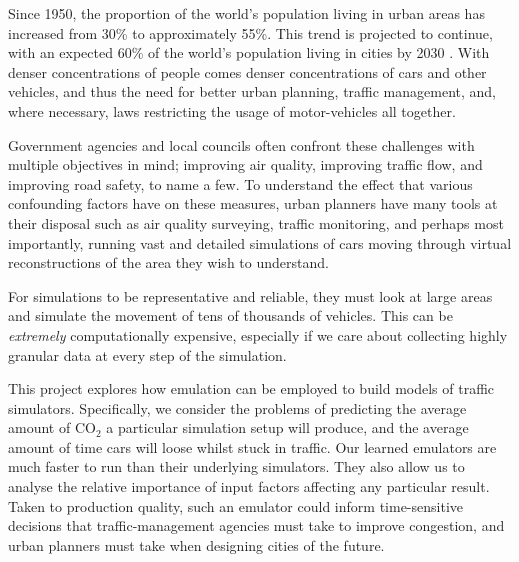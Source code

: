 Since 1950, the proportion of the world's population living in urban areas has increased from 30\% to approximately 55\%. This trend is projected to continue, with an expected 60\% of the world's population living in cities by 2030 \cite{bravo2018sustainable}. With denser concentrations of people comes denser concentrations of cars and other vehicles, and thus the need for better urban planning, traffic management, and, where necessary, laws restricting the usage of motor-vehicles all together.

Government agencies and local councils often confront these challenges with multiple objectives in mind; improving air quality, improving traffic flow, and improving road safety, to name a few. To understand the effect that various confounding factors have on these measures, urban planners have many tools at their disposal such as air quality surveying, traffic monitoring, and perhaps most importantly, running vast and detailed simulations of cars moving through virtual reconstructions of the area they wish to understand.

For simulations to be representative and reliable, they must look at large areas and simulate the movement of tens of thousands of vehicles. This can be \textit{extremely} computationally expensive, especially if we care about collecting highly granular data at every step of the simulation. 

This project explores how emulation can be employed to build models of traffic simulators. Specifically, we consider the problems of predicting the average amount of CO$_2$ a particular simulation setup will produce, and the average amount of time cars will loose whilst stuck in traffic. Our learned emulators are much faster to run than their underlying simulators. They also allow us to analyse the relative importance of input factors affecting any particular result. Taken to production quality, such an emulator could inform time-sensitive decisions that traffic-management agencies must take to improve congestion, and urban planners must take when designing cities of the future.


